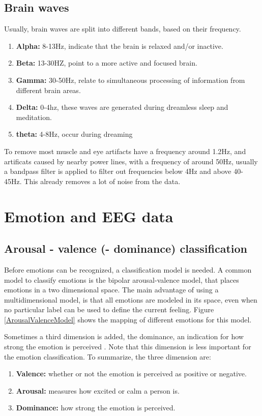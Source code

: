 \subsection{Brain waves}
Usually, brain waves are split into different bands, based on their frequency\cite{EmotionRelativePower}\cite{WavesSite}.
\begin{enumerate}
\item \textbf{Alpha:} 8-13Hz, indicate that the brain is relaxed and/or inactive.
\item \textbf{Beta:} 13-30HZ, point to a more active and focused brain.
\item \textbf{Gamma:} 30-50Hz, relate to simultaneous processing of information from different brain areas.
\item \textbf{Delta:} 0-4hz, these waves are generated during dreamless sleep and meditation.
\item \textbf{theta:} 4-8Hz, occur during dreaming
\end{enumerate}
To remove most muscle and eye artifacts have a frequency around 1.2Hz, and artificats caused by nearby power lines, with a frequency of around 50Hz\cite{ExtendedPaper}, usually a bandpass filter is applied to filter out frequencies below 4Hz and above 40-45Hz. This already removes a lot of noise from the data.

\section{Emotion and EEG data}

\subsection{Arousal - valence (- dominance) classification}
Before emotions can be recognized, a classification model is needed. A common model to classify emotions is the bipolar arousal-valence model\cite{ExtendedPaper}\cite{RealTimeEEGEmotion}, that places emotions in a two dimensional space. The main advantage of using a multidimensional model, is that all emotions are modeled in its space, even when no particular label can be used to define the current feeling. Figure \ref{ArousalValenceModel} shows the mapping of different emotions for this model.

Sometimes a third dimension is added, the dominance, an indication for how strong the emotion is perceived \cite{EEGDatasets}. Note that this dimension is less important for the emotion classification. To summarize, the three dimension are:
\begin{enumerate}
\item \textbf{Valence:} whether or not the emotion is perceived as positive or negative.
\item \textbf{Arousal:} measures how excited or calm a person is.
\item \textbf{Dominance:} how strong the emotion is perceived.
\end{enumerate}

